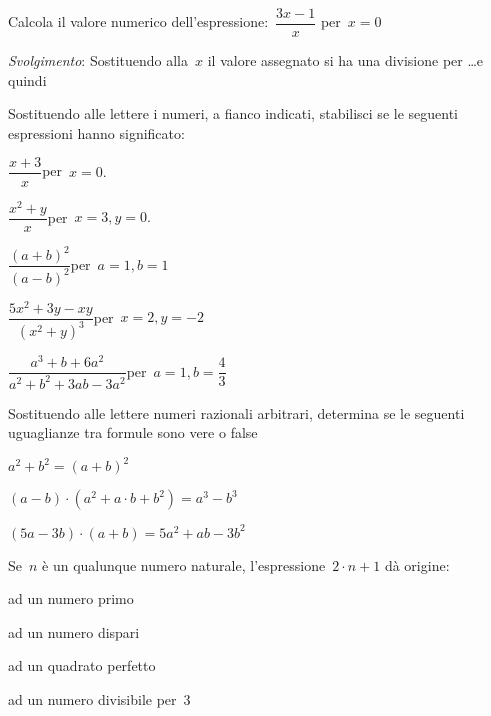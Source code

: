\begin{esercizio}
 \label{ese:8.26}
Calcola il valore numerico dell'espressione:~$\dfrac{3x-1}{x}$ per~$x = 0$

\emph{Svolgimento}: Sostituendo alla~$x$ il valore assegnato si ha una
divisione per \ldots e quindi \dotfill
\end{esercizio}

\begin{esercizio}[\Ast]
 \label{ese:8.27}
Sostituendo alle lettere i numeri, a fianco indicati, stabilisci se le
seguenti espressioni hanno significato:
\TabPositions{8cm}
\begin{enumeratea}
\item $\dfrac{x+3}{x}$\quad per~$x=0.$ \tab\boxSi\quad\boxNo
\item $\dfrac{x^{2}+y}{x}$\quad per~$x=3, y=0.$ \tab\boxSi\quad\boxNo
\item $\dfrac{(a+b)^{2}}{(a-b)^{2}}$\quad per~$a=1, b=1$ \tab\boxSi\quad\boxNo
\item $\dfrac{5x^{2}+3y-xy}{(x^{2}+y)^{3}}$\quad per~$x=2, y=-2$ 
\tab\boxSi\quad\boxNo
\item $\dfrac{a^{3}+b+6a^{2}}{a^{2}+b^{2}+3ab-3a^{2}}$\quad per~$a=1, 
b=\dfrac{4}{3}$ \tab\boxSi\quad\boxNo
\end{enumeratea}
\end{esercizio}

\begin{esercizio}
 \label{ese:8.28}
 Sostituendo alle lettere numeri razionali
arbitrari, determina se le seguenti uguaglianze tra formule sono
vere o false
\TabPositions{8cm}
\begin{enumeratea}
 \item $a^{2}+b^{2}=(a+b)^{2}$ \tab\boxV\quad\boxF
 \item $(a-b)\cdot (a^{2}+a\cdot b+b^{2})=a^{3}-b^{3}$ \tab\boxV\quad\boxF
 \item $(5a-3b)\cdot (a+b)=5a^{2}+ab-3b^{2}$ \tab\boxV\quad\boxF
\end{enumeratea}
\end{esercizio}

\newpage

\begin{esercizio}
 \label{ese:8.29}
 Se~$n$ è un qualunque numero naturale,
l'espressione~$2\cdot n+1$ dà origine:
\begin{multicols}{2}
\boxA\quad ad un numero primo

\boxB\quad ad un numero dispari

\boxC\quad ad un quadrato perfetto

\boxD\quad ad un numero divisibile per~3
\end{multicols}
\end{esercizio}

